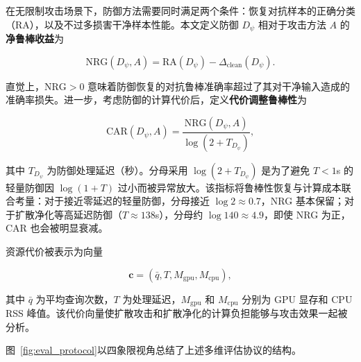 \documentclass[type=bachelor,oneside]{fduthesis}
\begin{document}
在无限制攻击场景下，防御方法需要同时满足两个条件：恢复对抗样本的正确分类（RA），以及不过多损害干净样本性能。本文定义防御 $D_\psi$ 相对于攻击方法 $A$ 的\textbf{净鲁棒收益}为

\begin{equation}
  \text{NRG}(D_\psi, A) = \text{RA}(D_\psi) - \Delta_{\text{clean}}(D_\psi).
  \label{eq:nrg}
\end{equation}

直觉上，$\text{NRG} > 0$ 意味着防御恢复的对抗鲁棒准确率超过了其对干净输入造成的准确率损失。进一步，考虑防御的计算代价后，定义\textbf{代价调整鲁棒性}为

\begin{equation}
  \text{CAR}(D_\psi, A) = \frac{\text{NRG}(D_\psi, A)}{\log(2 + T_{D_\psi})},
  \label{eq:car}
\end{equation}

其中 $T_{D_\psi}$ 为防御处理延迟（秒）。分母采用 $\log(2+T_{D_\psi})$ 是为了避免 $T<1$s 的轻量防御因 $\log(1+T)$ 过小而被异常放大。该指标将鲁棒性恢复与计算成本联合考量：对于接近零延迟的轻量防御，分母接近 $\log 2 \approx 0.7$，NRG 基本保留；对于扩散净化等高延迟防御（$T\approx 138$s），分母约 $\log 140 \approx 4.9$，即使 NRG 为正，CAR 也会被明显衰减。

资源代价被表示为向量

\begin{equation}
  \mathbf{c} =
  (\bar{q}, T, M_{\text{gpu}}, M_{\text{cpu}}),
  \label{eq:cost_vector}
\end{equation}

其中 $\bar{q}$ 为平均查询次数，$T$ 为处理延迟，$M_{\text{gpu}}$ 和 $M_{\text{cpu}}$ 分别为 GPU 显存和 CPU RSS 峰值。该代价向量使扩散攻击和扩散净化的计算负担能够与攻击效果一起被分析。

图~\ref{fig:eval_protocol}以四象限视角总结了上述多维评估协议的结构。
\end{document}
